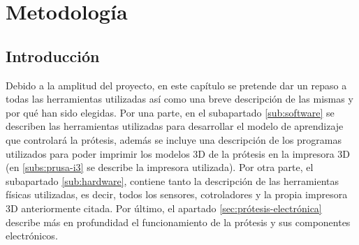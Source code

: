 
\chapter{Metodología} %
\label{Chapter2}







\section{Introducción}
\label{sec:introducción2}



Debido a la amplitud del proyecto, en este capítulo se pretende dar un repaso a todas las herramientas utilizadas así como una breve descripción de las mismas y por qué han sido elegidas. Por una parte, en el subapartado \ref{sub:software} se describen las herramientas utilizadas para desarrollar el modelo de aprendizaje que controlará la prótesis, además se incluye una descripción de los programas utilizados para poder imprimir los modelos 3D de la prótesis en la impresora 3D (en \ref{subs:prusa-i3} se describe la impresora utilizada). Por otra parte, el subapartado \ref{sub:hardware}, contiene tanto la descripción de las herramientas físicas utilizadas, es decir, todos los sensores, cotroladores y la propia impresora 3D anteriormente citada. Por último, el apartado \ref{sec:prótesis-electrónica} describe más en profundidad el funcionamiento de la prótesis y sus componentes electrónicos.



